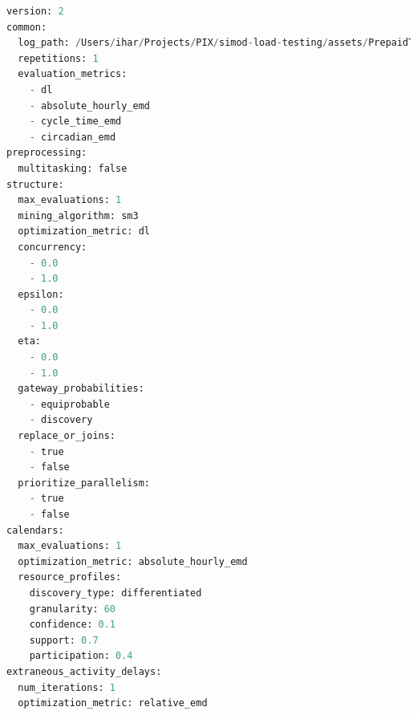 \documentclass[12pt]{article}
\begin{document}
\begin{lstlisting}[language=Python]
version: 2
common:
  log_path: /Users/ihar/Projects/PIX/simod-load-testing/assets/PrepaidTravelCost.xes
  repetitions: 1
  evaluation_metrics:
    - dl
    - absolute_hourly_emd
    - cycle_time_emd
    - circadian_emd
preprocessing:
  multitasking: false
structure:
  max_evaluations: 1
  mining_algorithm: sm3
  optimization_metric: dl
  concurrency:
    - 0.0
    - 1.0
  epsilon:
    - 0.0
    - 1.0
  eta:
    - 0.0
    - 1.0
  gateway_probabilities:
    - equiprobable
    - discovery
  replace_or_joins:
    - true
    - false
  prioritize_parallelism:
    - true
    - false
calendars:
  max_evaluations: 1
  optimization_metric: absolute_hourly_emd
  resource_profiles:
    discovery_type: differentiated
    granularity: 60
    confidence: 0.1
    support: 0.7
    participation: 0.4
extraneous_activity_delays:
  num_iterations: 1
  optimization_metric: relative_emd
\end{lstlisting}

\newpage
\end{document}
